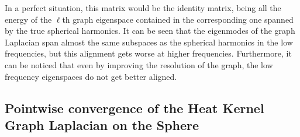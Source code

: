 In a perfect situation, this matrix would be the identity matrix, being all the energy of the $\ell$th graph eigenspace contained in the corresponding one spanned by the true spherical harmonics. It can be seen that the eigenmodes of the graph Laplacian span almost the same subspaces as the spherical harmonics in the low frequencies, but this alignment gets worse at higher frequencies. Furthermore, it can be noticed that even by improving the resolution of the graph, the low frequency eigenspaces do not get better aligned.



\subsection{Pointwise convergence of the Heat Kernel Graph Laplacian on the Sphere}


